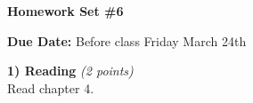 

\def\xyprime{\ensuremath{\begin{pmatrix} x' \\ y' \end{pmatrix}}}



\thispagestyle{fancy}






\begin{center}
{\huge \textbf{Homework Set \#6}}
\large

{\textbf{ Due Date:} Before class Friday March 24th  }
\end{center}

\textbf{1) Reading } \hfill \textit{(2 points)}\\
Read chapter 4.

\vspace*{0.25in}


